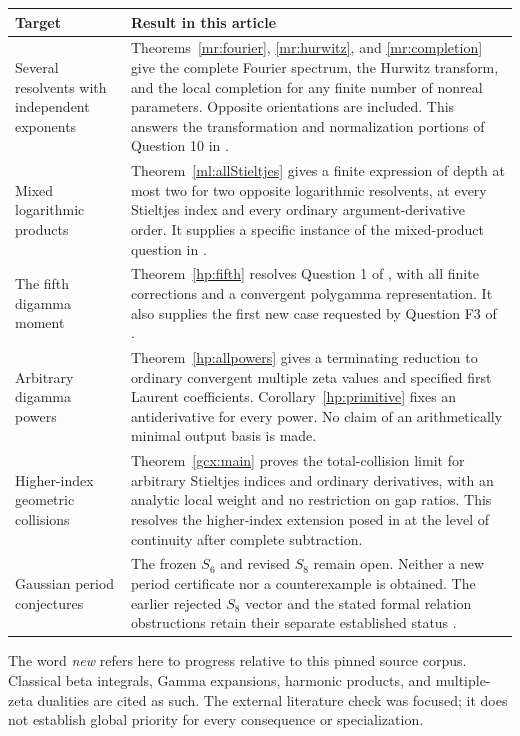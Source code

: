 \begin{longtable}{>{\raggedright\arraybackslash}p{}
                  >{\raggedright\arraybackslash}p{}}
\toprule
Target & Result in this article\\
\midrule
\endhead
Several resolvents with independent exponents &
Theorems~\ref{mr:fourier}, \ref{mr:hurwitz}, and \ref{mr:completion}
give the complete Fourier spectrum, the Hurwitz transform, and the
local completion for any finite number of nonreal parameters. Opposite
orientations are included. This answers the transformation and
normalization portions of Question 10 in \cite{repo:quartic}.\\[5pt]
Mixed logarithmic products &
Theorem~\ref{ml:allStieltjes} gives a finite expression of depth at
most two for two opposite logarithmic resolvents, at every Stieltjes
index and every ordinary argument-derivative order. It supplies a
specific instance of the mixed-product question in \cite{repo:quartic}.\\[5pt]
The fifth digamma moment &
Theorem~\ref{hp:fifth} resolves Question 1 of
\cite{repo:quartic}, with all finite corrections and a convergent
polygamma representation. It also supplies the first new case requested
by Question F3 of \cite{repo:barnes}.\\[5pt]
Arbitrary digamma powers &
Theorem~\ref{hp:allpowers} gives a terminating reduction to ordinary
convergent multiple zeta values and specified first Laurent coefficients.
Corollary~\ref{hp:primitive} fixes an antiderivative for every power.
No claim of an arithmetically minimal output basis is made.\\[5pt]
Higher-index geometric collisions &
Theorem~\ref{gcx:main} proves the total-collision limit for arbitrary
Stieltjes indices and ordinary derivatives, with an analytic local
weight and no restriction on gap ratios. This resolves the higher-index
extension posed in \cite{repo:reflection} at the level of continuity
after complete subtraction.\\[5pt]
Gaussian period conjectures &
The frozen $S_6$ and revised $S_8$ remain open. Neither a new period
certificate nor a counterexample is obtained. The earlier rejected
$S_8$ vector and the stated formal relation obstructions retain their
separate established status \cite{repo:main,repo:exact}.\\
\bottomrule
\end{longtable}

The word \emph{new} refers here to progress relative to this
pinned source corpus. Classical beta integrals, Gamma expansions,
harmonic products, and multiple-zeta dualities are cited as such.
The external literature check was focused; it does not establish global
priority for every consequence or specialization.

